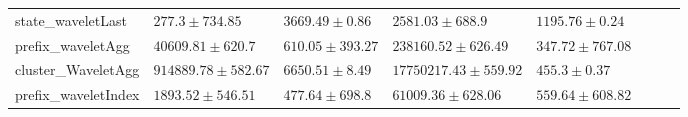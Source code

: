 \documentclass[twoside,11pt]{Latex/Classes/PhDthesisPSnPDF}
\begin{document}
\begin{table}[h]
{\begin{tabular}{llllllll}
				state\_waveletLast & $\mathbf{277.3 \pm 734.85}$ & $3669.49 \pm 0.86$ & $2581.03 \pm 688.9$ & $1195.76 \pm 0.24$ \\ 
				prefix\_waveletAgg & $40609.81 \pm 620.7$ & $610.05 \pm 393.27$ & $238160.52 \pm 626.49$ & $\mathbf{347.72 \pm 767.08}$ \\ 
				cluster\_WaveletAgg & $914889.78 \pm 582.67$ & $6650.51 \pm 8.49$ & $17750217.43 \pm 559.92$ & $455.3 \pm 0.37$ \\ 
				prefix\_waveletIndex & $1893.52 \pm 546.51$ & $\mathbf{477.64 \pm 698.8}$ & $61009.36 \pm 628.06$ & $559.64 \pm 608.82$ \\ 
				\bottomrule
				

		\end{tabular}%
	}	
\end{table}
\end{document}
